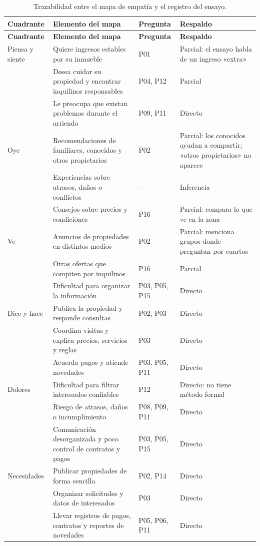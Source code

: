 \documentclass[11pt,a4paper]{article}
\begin{document}
\renewcommand{\arraystretch}{1.15}
\small
\begin{longtable}{>{\raggedright\arraybackslash}p{2.2cm}>{\raggedright\arraybackslash}p{6.4cm}>{\raggedright\arraybackslash}p{2.0cm}>{\raggedright\arraybackslash}p{5.6cm}}
\caption{Trazabilidad entre el mapa de empatía y el registro del ensayo.}\label{tab:traza}\\
\toprule
\textbf{Cuadrante} & \textbf{Elemento del mapa} & \textbf{Pregunta} & \textbf{Respaldo}\\
\midrule
\endfirsthead
\toprule
\textbf{Cuadrante} & \textbf{Elemento del mapa} & \textbf{Pregunta} & \textbf{Respaldo}\\
\midrule
\endhead
Piensa y siente & Quiere ingresos estables por su inmueble & P01 & Parcial: el ensayo habla de un ingreso «extra»\\
 & Desea cuidar su propiedad y encontrar inquilinos responsables & P04, P12 & Parcial\\
 & Le preocupa que existan problemas durante el arriendo & P09, P11 & Directo\\
\midrule
Oye & Recomendaciones de familiares, conocidos y otros propietarios & P02 & Parcial: los conocidos ayudan a compartir; «otros propietarios» no aparece\\
 & Experiencias sobre atrasos, daños o conflictos & --- & Inferencia\\
 & Consejos sobre precios y condiciones & P16 & Parcial: compara lo que ve en la zona\\
\midrule
Ve & Anuncios de propiedades en distintos medios & P02 & Parcial: menciona grupos donde preguntan por cuartos\\
 & Otras ofertas que compiten por inquilinos & P16 & Parcial\\
 & Dificultad para organizar la información & P03, P05, P15 & Directo\\
\midrule
Dice y hace & Publica la propiedad y responde consultas & P02, P03 & Directo\\
 & Coordina visitas y explica precios, servicios y reglas & P03 & Directo\\
 & Acuerda pagos y atiende novedades & P03, P05, P11 & Directo\\
\midrule
Dolores & Dificultad para filtrar interesados confiables & P12 & Directo: no tiene método formal\\
 & Riesgo de atrasos, daños o incumplimiento & P08, P09, P11 & Directo\\
 & Comunicación desorganizada y poco control de contratos y pagos & P03, P05, P15 & Directo\\
\midrule
Necesidades & Publicar propiedades de forma sencilla & P02, P14 & Directo\\
 & Organizar solicitudes y datos de interesados & P03 & Directo\\
 & Llevar registros de pagos, contratos y reportes de novedades & P05, P06, P11 & Directo\\
\bottomrule
\end{longtable}
\normalsize
\end{document}
